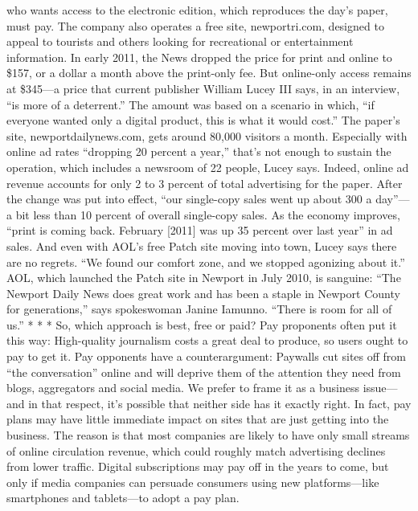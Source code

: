 who wants access to the electronic edition, which reproduces the day’s paper,
must pay. The company also operates a free site, newportri.com, designed to appeal
to tourists and others looking for recreational or entertainment information.
In early 2011, the News dropped the price for print and online to \$157, or
a dollar a month above the print-only fee. But online-only access remains at
\$345—a price that current publisher William Lucey III says, in an interview, ``is
more of a deterrent.'' The amount was based on a scenario in which, ``if everyone
wanted only a digital product, this is what it would cost.''
The paper’s site, newportdailynews.com, gets around 80,000 visitors a month.
Especially with online ad rates ``dropping 20 percent a year,'' that’s not enough
to sustain the operation, which includes a newsroom of 22 people, Lucey says.
Indeed, online ad revenue accounts for only 2 to 3 percent of total advertising
for the paper.
After the change was put into effect, ``our single-copy sales went up about 300
a day''—a bit less than 10 percent of overall single-copy sales. As the economy
improves, ``print is coming back. February [2011] was up 35 percent over last
year'' in ad sales.
And even with AOL’s free Patch site moving into town, Lucey says there are
no regrets. ``We found our comfort zone, and we stopped agonizing about it.''
AOL, which launched the Patch site in Newport in July 2010, is sanguine: ``The
Newport Daily News does great work and has been a staple in Newport County
for generations,'' says spokeswoman Janine Iamunno. ``There is room for all of us.''
* * *
So, which approach is best, free or paid?
Pay proponents often put it this way: High-quality journalism costs a great deal
to produce, so users ought to pay to get it. Pay opponents have a counterargument:
Paywalls cut sites off from ``the conversation'' online and will deprive them
of the attention they need from blogs, aggregators and social media.
We prefer to frame it as a business issue—and in that respect, it’s possible that
neither side has it exactly right. In fact, pay plans may have little immediate impact
on sites that are just getting into the business. The reason is that most companies
are likely to have only small streams of online circulation revenue, which
could roughly match advertising declines from lower traffic. Digital subscriptions
may pay off in the years to come, but only if media companies can persuade consumers
using new platforms—like smartphones and tablets—to adopt a pay plan.
